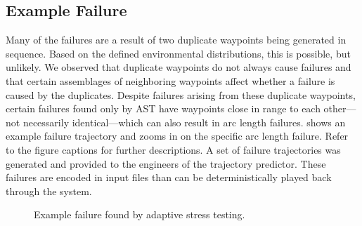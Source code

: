 \subsection{Example Failure}
Many of the failures are a result of two duplicate waypoints being generated in sequence.
Based on the defined environmental distributions, this is possible, but unlikely.
We observed that duplicate waypoints do not always cause failures and that certain assemblages of neighboring waypoints affect whether a failure is caused by the duplicates.
Despite failures arising from these duplicate waypoints, certain failures found only by AST have waypoints close in range to each other---not necessarily identical---which can also result in arc length failures. 
 shows an example failure trajectory and  zooms in on the specific arc length failure.
Refer to the figure captions for further descriptions.
A set of failure trajectories was generated and provided to the engineers of the trajectory predictor.
These failures are encoded in input files than can be deterministically played back through the system.


\begin{figure*}[!t]
  \centering
    \hspace{2mm}
  \caption{
    \label{fig:example_failure_full} Example failure found by adaptive stress testing. 
  } 
\end{figure*}



